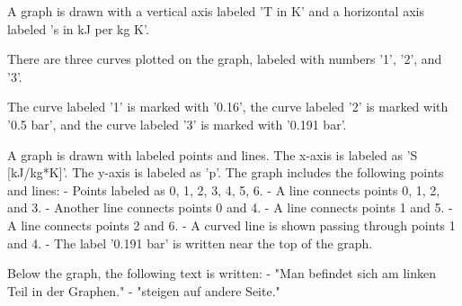 A graph is drawn with a vertical axis labeled 'T in K' and a horizontal axis labeled 's in kJ per kg K'. 

There are three curves plotted on the graph, labeled with numbers '1', '2', and '3'. 

The curve labeled '1' is marked with '0.16', the curve labeled '2' is marked with '0.5 bar', and the curve labeled '3' is marked with '0.191 bar'.

A graph is drawn with labeled points and lines. The x-axis is labeled as 'S [kJ/kg*K]'. The y-axis is labeled as 'p'. The graph includes the following points and lines:
- Points labeled as 0, 1, 2, 3, 4, 5, 6.
- A line connects points 0, 1, 2, and 3.
- Another line connects points 0 and 4.
- A line connects points 1 and 5.
- A line connects points 2 and 6.
- A curved line is shown passing through points 1 and 4.
- The label '0.191 bar' is written near the top of the graph.

Below the graph, the following text is written:
- "Man befindet sich am linken Teil in der Graphen."
- "steigen auf andere Seite."